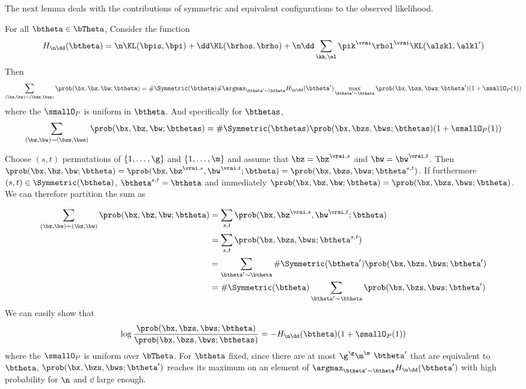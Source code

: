 \proofend

The next lemma deals with the contributions of symmetric and equivalent configurations to the observed likelihood. 

\begin{lemme}
  \label{lem:symmetry}
  For all $\btheta \in \bTheta$, Consider the function 
  \begin{equation*}
    H_{\n\dd}(\btheta) = \n \KL(\bpis, \bpi) + \dd \KL(\brhos, \brho) + \n\dd \sum_{\kk,\el} \pik^\vrai \rhol^\vrai \KL(\alskl, \alkl')
  \end{equation*}
  Then
  \begin{equation*}
    \sum_{(\bz, \bw) \sim (\bzs, \bws)} \prob(\bx, \bz, \bw; \btheta) = \# \Symmetric(\btheta) \# \argmax_{\btheta' \sim \btheta} H_{\n\dd}(\btheta') \max_{\btheta' \sim \btheta} \prob(\bx, \bzs, \bws; \btheta') (1 + \smallO_P(1))
  \end{equation*}
  where the $\smallO_P$ is uniform in $\btheta$. And specifically for $\bthetas$, 
  \begin{equation*}
    \sum_{(\bz, \bw) \sim (\bzs, \bws)} \prob(\bx, \bz, \bw; \bthetas) = \# \Symmetric(\bthetas) \prob(\bx, \bzs, \bws; \bthetas) (1 + \smallO_P(1))
  \end{equation*}
\end{lemme}

\proofbegin
Choose $(s, t)$ permutations of $\{1, \dots, \g\}$ and $\{1, \dots, \m\}$ and assume that $\bz = \bz^{\vrai,s}$ and $\bw = \bw^{\vrai, t}$. Then $\prob(\bx, \bz, \bw; \btheta) = \prob(\bx, \bz^{\vrai, s}, \bw^{\vrai, t}; \btheta) = \prob(\bx, \bzs, \bws; \btheta^{s,t})$.  If furthermore $(s, t) \in \Symmetric(\btheta)$, $\btheta^{s, t} = \btheta$ and immediately $\prob(\bx, \bz, \bw; \btheta) = \prob(\bx, \bzs, \bws; \btheta)$. We can therefore partition the sum as 

\begin{align*}
  \sum_{(\bz, \bw) \sim (\bz, \bw)} \prob(\bx, \bz, \bw; \btheta) & = \sum_{s, t} \prob(\bx, \bz^{\vrai, s}, \bw^{\vrai, t}; \btheta) \\ 
  & = \sum_{s, t} \prob(\bx, \bzs, \bws; \btheta^{s,t}) \\ 
  & = \sum_{\btheta' \sim \btheta} \# \Symmetric(\btheta') \prob(\bx, \bzs, \bws; \btheta') \\ 
  & = \# \Symmetric(\btheta) \sum_{\btheta' \sim \btheta} \prob(\bx, \bzs, \bws; \btheta') \\ 
\end{align*}
We can easily show that 
\begin{equation*}
  \log \frac{\prob(\bx, \bzs, \bws; \btheta)}{\prob(\bx, \bzs, \bws; \bthetas)} = - H_{\n\dd}(\btheta) ( 1 + \smallO_P(1))
\end{equation*}
where the $\smallO_P$ is uniform over $\bTheta$. For $\btheta$ fixed, since there are at most $\g^\g \m^\m$ $\btheta'$ that are equivalent to $\btheta$, $\prob(\bx, \bzs, \bws; \btheta')$ reaches its maximum on an element of $\argmax_{\btheta' \sim \btheta} H_{\n\dd}(\btheta')$ with high probability for $\n$ and $\dd$ large enough. 

